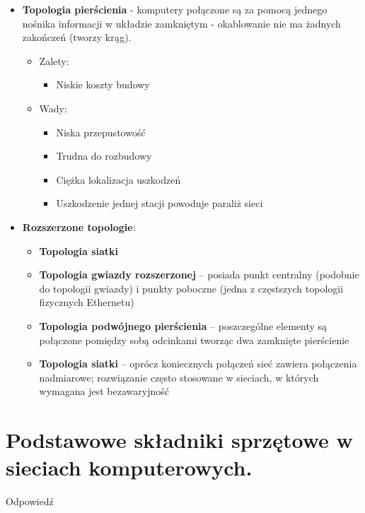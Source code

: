 \documentclass[12pt,a4paper]{article}
\begin{document}
\begin{itemize}
		\item \textbf{Topologia pierścienia} - komputery połączone są za pomocą jednego nośnika informacji w układzie zamkniętym - okablowanie nie ma żadnych zakończeń (tworzy krąg).
		\begin{itemize}
			\item Zalety:
			\begin{itemize}
				\item Niskie koszty budowy
			\end{itemize}
			\item Wady:
			\begin{itemize}
				\item Niska przepustowość
				\item Trudna do rozbudowy
				\item Ciężka lokalizacja uszkodzeń
				\item Uszkodzenie jednej stacji powoduje paraliż sieci
			\end{itemize}
		\end{itemize}
		
		\item \textbf{Rozszerzone topologie}:
		\begin{itemize}
			\item \textbf{Topologia siatki}
			\item \textbf{Topologia gwiazdy rozszerzonej} – posiada punkt centralny (podobnie do topologii gwiazdy) i punkty poboczne (jedna z częstszych topologii fizycznych Ethernetu)
			\item \textbf{Topologia podwójnego pierścienia} – poszczególne elementy są połączone pomiędzy sobą odcinkami tworząc dwa zamknięte pierścienie
			\item \textbf{Topologia siatki} – oprócz koniecznych połączeń sieć zawiera połączenia nadmiarowe; rozwiązanie często stosowane w sieciach, w których wymagana jest bezawaryjność
		\end{itemize}
	\end{itemize}

	\section{Podstawowe składniki sprzętowe w sieciach komputerowych.}
	Odpowiedź
\end{document}
